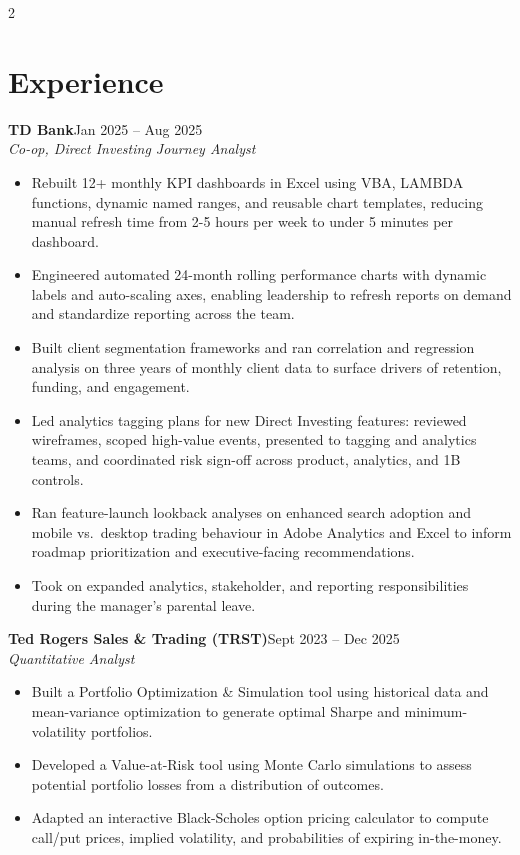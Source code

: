 \documentclass[10pt,letterpaper]{article}
\newcommand{\role}[3]{%
  \needspace{4\baselineskip}%
  {\bfseries #1}\hfill{\color{soft}\small #3}\\
  {\color{soft}\itshape #2}\\[1pt]
}
\begin{document}
\begin{paracol}{2}
\section*{Experience}
\role{TD Bank}{Co-op, Direct Investing Journey Analyst}{Jan 2025 -- Aug 2025}
\begin{itemize}
  \item Rebuilt 12+ monthly KPI dashboards in Excel using VBA, LAMBDA functions, dynamic named ranges, and reusable chart templates, reducing manual refresh time from 2-5 hours per week to under 5 minutes per dashboard.
  \item Engineered automated 24-month rolling performance charts with dynamic labels and auto-scaling axes, enabling leadership to refresh reports on demand and standardize reporting across the team.
  \item Built client segmentation frameworks and ran correlation and regression analysis on three years of monthly client data to surface drivers of retention, funding, and engagement.
  \item Led analytics tagging plans for new Direct Investing features: reviewed wireframes, scoped high-value events, presented to tagging and analytics teams, and coordinated risk sign-off across product, analytics, and 1B controls.
  \item Ran feature-launch lookback analyses on enhanced search adoption and mobile vs.\ desktop trading behaviour in Adobe Analytics and Excel to inform roadmap prioritization and executive-facing recommendations.
  \item Took on expanded analytics, stakeholder, and reporting responsibilities during the manager's parental leave.
\end{itemize}

\role{Ted Rogers Sales \& Trading (TRST)}{Quantitative Analyst}{Sept 2023 -- Dec 2025}
\begin{itemize}
  \item Built a Portfolio Optimization \& Simulation tool using historical data and mean-variance optimization to generate optimal Sharpe and minimum-volatility portfolios.
  \item Developed a Value-at-Risk tool using Monte Carlo simulations to assess potential portfolio losses from a distribution of outcomes.
  \item Adapted an interactive Black-Scholes option pricing calculator to compute call/put prices, implied volatility, and probabilities of expiring in-the-money.
\end{itemize}


\end{paracol}
\end{document}
